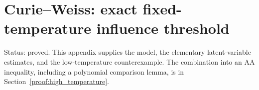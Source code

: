 \section{Curie--Weiss: exact fixed-temperature influence threshold}\label{cw:curieweiss-exact-fixed-temperature-influence-threshold}\label{proof:curie_weiss}

Status: proved. This appendix supplies the model, the elementary latent-variable estimates, and the low-temperature counterexample. The combination into an AA inequality, including a polynomial comparison lemma, is in Section~\ref{proof:high_temperature}.











